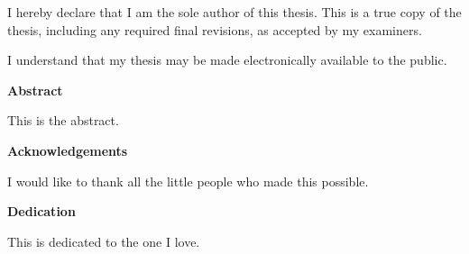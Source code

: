 \cleardoublepage %
 


  \noindent
I hereby declare that I am the sole author of this thesis. This is a true copy of the thesis, including any required final revisions, as accepted by my examiners.

  \bigskip
  
  \noindent
I understand that my thesis may be made electronically available to the public.

\cleardoublepage


\begin{center}\textbf{Abstract}\end{center}

This is the abstract.

\cleardoublepage


\begin{center}\textbf{Acknowledgements}\end{center}

I would like to thank all the little people who made this possible.
\cleardoublepage


\begin{center}\textbf{Dedication}\end{center}

This is dedicated to the one I love.
\cleardoublepage

\renewcommand\contentsname{Table of Contents}
\tableofcontents
\cleardoublepage
{}

\listoftables
\cleardoublepage
{}		%

\listoffigures
\cleardoublepage
{}		%



